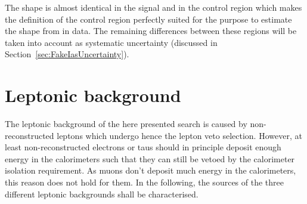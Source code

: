 The \ias shape is almost identical in the signal and in the control region which makes the definition of the control region perfectly suited for the purpose to estimate the \ias shape from \fakeCR in data.
The remaining differences between these regions will be taken into account as systematic uncertainty (discussed in Section~\ref{sec:FakeIasUncertainty}).

\section{Leptonic background}
\label{sec:LeptonicBkg}

The leptonic background of the here presented search is caused by non-reconstructed leptons which undergo hence the lepton veto selection.
However, at least non-reconstructed electrons or taus should in principle deposit enough energy in the calorimeters such that they can still be vetoed by the calorimeter isolation requirement.
As muons don't deposit much energy in the calorimeters, this reason does not hold for them.
In the following, the sources of the three different leptonic backgrounds shall be characterised.

